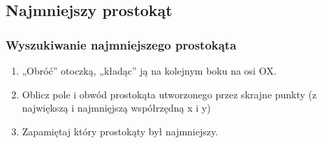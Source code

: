 \documentclass{beamer}
\begin{document}



\subsection{Najmniejszy prostokąt}

\begin{frame}
\frametitle{Wyszukiwanie najmniejszego prostokąta}
\begin{enumerate}[1)]
\item „Obróć” otoczką, „kładąc” ją na kolejnym boku na osi OX.
\item Oblicz pole i obwód prostokąta utworzonego przez skrajne punkty (z największą i najmnięjszą współrzędną x i y)
\item Zapamiętaj który prostokąty był najmniejszy.
\end{enumerate}

\end{frame}

\end{document}
